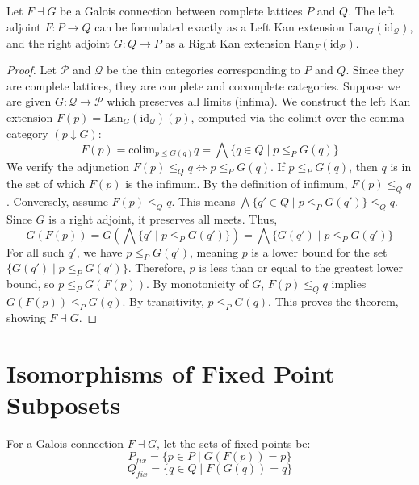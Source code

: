 \begin{theorem}
Let $F \dashv G$ be a Galois connection between complete lattices $P$ and $Q$. The left adjoint $F: P \to Q$ can be formulated exactly as a Left Kan extension $\text{Lan}_G (\text{id}_{\mathcal{Q}})$, and the right adjoint $G: Q \to P$ as a Right Kan extension $\text{Ran}_F (\text{id}_{\mathcal{P}})$.
\end{theorem}
\begin{proof}
Let $\mathcal{P}$ and $\mathcal{Q}$ be the thin categories corresponding to $P$ and $Q$. Since they are complete lattices, they are complete and cocomplete categories.
Suppose we are given $G: \mathcal{Q} \to \mathcal{P}$ which preserves all limits (infima). We construct the left Kan extension $F(p) = \text{Lan}_{G} (\text{id}_{\mathcal{Q}}) (p)$, computed via the colimit over the comma category $(p \downarrow G)$:
\[ F(p) = \text{colim}_{p \leq G(q)} q = \bigwedge \{ q \in Q \mid p \leq_P G(q) \} \]
We verify the adjunction $F(p) \leq_Q q \iff p \leq_P G(q)$.
If $p \leq_P G(q)$, then $q$ is in the set of which $F(p)$ is the infimum. By the definition of infimum, $F(p) \leq_Q q$.
Conversely, assume $F(p) \leq_Q q$. This means $\bigwedge \{ q' \in Q \mid p \leq_P G(q') \} \leq_Q q$. Since $G$ is a right adjoint, it preserves all meets. Thus,
\[ G(F(p)) = G\left(\bigwedge \{ q' \mid p \leq_P G(q') \}\right) = \bigwedge \{ G(q') \mid p \leq_P G(q') \} \]
For all such $q'$, we have $p \leq_P G(q')$, meaning $p$ is a lower bound for the set $\{ G(q') \mid p \leq_P G(q') \}$. Therefore, $p$ is less than or equal to the greatest lower bound, so $p \leq_P G(F(p))$.
By monotonicity of $G$, $F(p) \leq_Q q$ implies $G(F(p)) \leq_P G(q)$. By transitivity, $p \leq_P G(q)$.
This proves the theorem, showing $F \dashv G$.
\end{proof}

\section{Isomorphisms of Fixed Point Subposets}

\begin{definition}
For a Galois connection $F \dashv G$, let the sets of fixed points be:
\[ P_{fix} = \{ p \in P \mid G(F(p)) = p \} \]
\[ Q_{fix} = \{ q \in Q \mid F(G(q)) = q \} \]
\end{definition}

